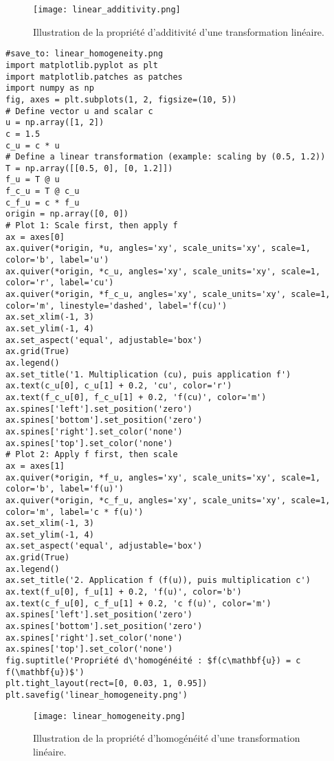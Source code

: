 \begin{figure}[H]
\centering
\texttt{[image: linear\_additivity.png]}
\caption{Illustration de la propriété d'additivité d'une transformation linéaire.}
\label{fig:linear_additivity}
\end{figure}
\begin{verbatim}
#save_to: linear_homogeneity.png
import matplotlib.pyplot as plt
import matplotlib.patches as patches
import numpy as np
fig, axes = plt.subplots(1, 2, figsize=(10, 5))
# Define vector u and scalar c
u = np.array([1, 2])
c = 1.5
c_u = c * u
# Define a linear transformation (example: scaling by (0.5, 1.2))
T = np.array([[0.5, 0], [0, 1.2]])
f_u = T @ u
f_c_u = T @ c_u
c_f_u = c * f_u
origin = np.array([0, 0])
# Plot 1: Scale first, then apply f
ax = axes[0]
ax.quiver(*origin, *u, angles='xy', scale_units='xy', scale=1, color='b', label='u')
ax.quiver(*origin, *c_u, angles='xy', scale_units='xy', scale=1, color='r', label='cu')
ax.quiver(*origin, *f_c_u, angles='xy', scale_units='xy', scale=1, color='m', linestyle='dashed', label='f(cu)')
ax.set_xlim(-1, 3)
ax.set_ylim(-1, 4)
ax.set_aspect('equal', adjustable='box')
ax.grid(True)
ax.legend()
ax.set_title('1. Multiplication (cu), puis application f')
ax.text(c_u[0], c_u[1] + 0.2, 'cu', color='r')
ax.text(f_c_u[0], f_c_u[1] + 0.2, 'f(cu)', color='m')
ax.spines['left'].set_position('zero')
ax.spines['bottom'].set_position('zero')
ax.spines['right'].set_color('none')
ax.spines['top'].set_color('none')
# Plot 2: Apply f first, then scale
ax = axes[1]
ax.quiver(*origin, *f_u, angles='xy', scale_units='xy', scale=1, color='b', label='f(u)')
ax.quiver(*origin, *c_f_u, angles='xy', scale_units='xy', scale=1, color='m', label='c * f(u)')
ax.set_xlim(-1, 3)
ax.set_ylim(-1, 4)
ax.set_aspect('equal', adjustable='box')
ax.grid(True)
ax.legend()
ax.set_title('2. Application f (f(u)), puis multiplication c')
ax.text(f_u[0], f_u[1] + 0.2, 'f(u)', color='b')
ax.text(c_f_u[0], c_f_u[1] + 0.2, 'c f(u)', color='m')
ax.spines['left'].set_position('zero')
ax.spines['bottom'].set_position('zero')
ax.spines['right'].set_color('none')
ax.spines['top'].set_color('none')
fig.suptitle('Propriété d\'homogénéité : $f(c\mathbf{u}) = c f(\mathbf{u})$')
plt.tight_layout(rect=[0, 0.03, 1, 0.95])
plt.savefig('linear_homogeneity.png')
\end{verbatim}
\begin{figure}[H]
\centering
\texttt{[image: linear\_homogeneity.png]}
\caption{Illustration de la propriété d'homogénéité d'une transformation linéaire.}
\label{fig:linear_homogeneity}
\end{figure}
